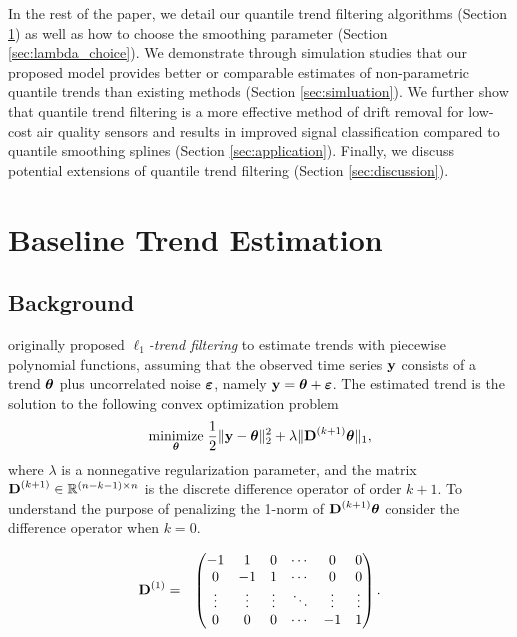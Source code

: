 \documentclass[aoas]{imsart}
\newcommand{\Real}{\mathbb{R}}
\newcommand{\V}[1]{{\bm{\mathbf{\MakeLowercase{#1}}}}} %
\newcommand{\M}[1]{{\bm{\mathbf{\MakeUppercase{#1}}}}} %
\newcommand{\Mn}[2]{\M{#1}^{(#2)}} %
\begin{document}
In the rest of the paper, we detail our quantile trend filtering algorithms (Section \ref{sec:methods}) as well as how to choose the smoothing parameter (Section \ref{sec:lambda_choice}). We demonstrate through simulation studies that our proposed model provides better or comparable estimates of non-parametric quantile trends than existing methods (Section \ref{sec:simluation}). We further show that quantile trend filtering is a more effective method of drift removal for low-cost air quality sensors and results in improved signal classification compared to quantile smoothing splines (Section \ref{sec:application}). Finally, we discuss potential extensions of quantile trend filtering (Section \ref{sec:discussion}).

\section{Baseline Trend Estimation}
\label{sec:methods}

\subsection{Background}

\cite{Kim2009} originally proposed \textit{$\ell_1$-trend filtering} to estimate trends with piecewise polynomial functions, assuming that the observed time series $\V{y}$ consists of a trend $\V{\theta}$ plus uncorrelated noise $\V{\varepsilon}$, namely $\V{y} = \V{\theta} + \V{\varepsilon}$. The estimated trend is the solution to the following convex optimization problem
\begin{eqnarray*}
	\underset{\V{\theta}}{\text{minimize}}\; \frac{1}{2} \lVert \V{y} - \V{\theta} \rVert_2^2 + \lambda \lVert \Mn{D}{k+1}\V{\theta} \rVert_1,
\end{eqnarray*}
where $\lambda$ is a nonnegative regularization parameter, and the matrix $\Mn{D}{k+1} \in \Real^{(n - k -1) \times n}$ is the discrete difference operator of order $k+1$. To understand the purpose of penalizing the 1-norm of $\Mn{D}{k+1}\V{\theta}$ consider the difference operator when $k = 0$.

\begin{eqnarray*}
	\Mn{D}{1} & = & \begin{pmatrix}
		-1 & 1 & 0 & \cdots & 0 & 0 \\
		0 & -1 & 1 & \cdots & 0 & 0 \\
		\vdots & \vdots & \vdots & \ddots & \vdots & \vdots \\
		0 & 0 & 0 & \cdots & -1 & 1 \\
	\end{pmatrix}.
\end{eqnarray*}
\end{document}
